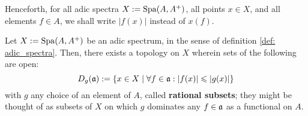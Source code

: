                     \begin{convention}
                        Henceforth, for all adic spectra $X := \mathrm{Spa}(A, A^+)$, all points $x \in X$, and all elements $f \in A$, we shall write $|f(x)|$ instead of $x(f)$.
                    \end{convention}
                    \begin{proposition} \label{prop: the_rational_topology}
                        Let $X := \mathrm{Spa}(A, A^+)$ be an adic spectrum, in the sense of definition \ref{def: adic_spectra}. Then, there exists a topology on $X$ wherein sets of the following are open:
                            $$D_g(\mathfrak{a}) := \{x \in X \mid \forall f \in \mathfrak{a}: |f(x)| \leqslant |g(x)|\}$$
                        with $g$ any choice of an element of $A$, called \textbf{rational subsets}; they might be thought of as subsets of $X$ on which $g$ dominates any $f \in \mathfrak{a}$ as a functional on $A$.
                    \end{proposition}
